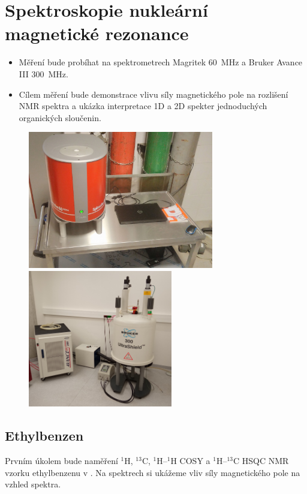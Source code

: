 \documentclass[12pt]{article}
\begin{document}
\newpage
\section{Spektroskopie nukleární magnetické rezonance}
\begin{itemize}
	\item Měření bude probíhat na spektrometrech Magritek 60~MHz a Bruker Avance III 300~MHz.
	\item Cílem měření bude demonstrace vlivu síly magnetického pole na rozlišení NMR spektra a ukázka interpretace 1D a 2D spekter jednoduchých organických sloučenin.
\end{itemize}

\begin{figure}[h]
	\includegraphics[keepaspectratio,height=6cm]{img/Magritek.jpg}
	\includegraphics[keepaspectratio,height=6cm]{img/NMR300-1S12.jpg}
\end{figure}

\subsection{Ethylbenzen}

Prvním úkolem bude naměření $^1$H, $^{13}$C, $^1$H--$^1$H COSY a $^1$H--$^{13}$C HSQC NMR vzorku ethylbenzenu v . Na spektrech si ukážeme vliv síly magnetického pole na vzhled spektra.
\end{document}
